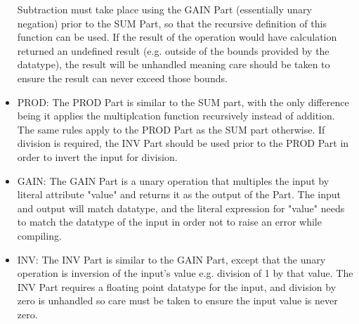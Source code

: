 \begin{itemize}[label={}]
Subtraction must take place using the GAIN Part (essentially unary negation) prior to the SUM Part, so that the recursive definition of this function can be used.
If the result of the operation would have calculation returned an undefined result (e.g. outside of the bounds provided by the datatype), the result will be unhandled meaning care should be taken to ensure the result can never exceed those bounds.
    \item PROD:
The PROD Part is similar to the SUM part, with the only difference being it applies the multiplcation function recursively instead of addition.
The same rules apply to the PROD Part as the SUM part otherwise.
If division is required, the INV Part should be used prior to the PROD Part in order to invert the input for division.
    \item GAIN:
The GAIN Part is a unary operation that multiples the input by literal attribute "value" and returns it as the output of the Part.
The input and output will match datatype, and the literal expression for "value" needs to match the datatype of the input in order not to raise an error while compiling.
    \item INV:
The INV Part is similar to the GAIN Part, except that the unary operation is inversion of the input's value e.g. division of 1 by that value.
The INV Part requires a floating point datatype for the input, and division by zero is unhandled so care must be taken to ensure the input value is never zero.
\end{itemize}
